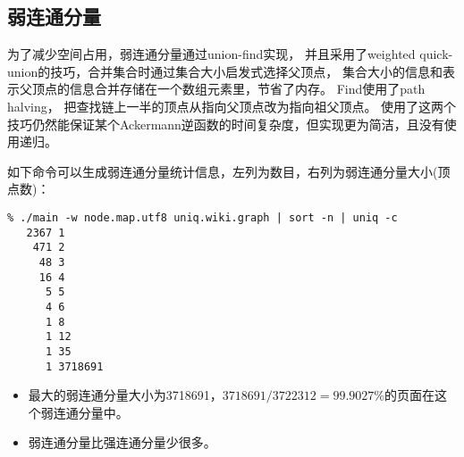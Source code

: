 \subsection{弱连通分量}

为了减少空间占用，弱连通分量通过union-find实现，
并且采用了weighted quick-union的技巧，合并集合时通过集合大小启发式选择父顶点，
集合大小的信息和表示父顶点的信息合并存储在一个数组元素里，节省了内存。
Find使用了path halving，
把查找链上一半的顶点从指向父顶点改为指向祖父顶点。
使用了这两个技巧仍然能保证某个Ackermann逆函数的时间复杂度，但实现更为简洁，且没有使用递归。

如下命令可以生成弱连通分量统计信息，左列为数目，右列为弱连通分量大小(顶点数)：

\begin{verbatim}
% ./main -w node.map.utf8 uniq.wiki.graph | sort -n | uniq -c
   2367 1
    471 2
     48 3
     16 4
      5 5
      4 6
      1 8
      1 12
      1 35
      1 3718691
\end{verbatim}

\begin{itemize}
  \item 最大的弱连通分量大小为3718691，$3718691/3722312=99.9027\%$的页面在这个弱连通分量中。
  \item 弱连通分量比强连通分量少很多。
\end{itemize}

